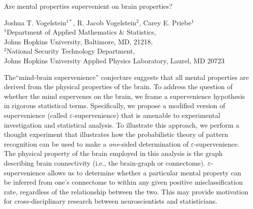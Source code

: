 \documentclass{article}
\newcommand{\eps}{\varepsilon}
\begin{document}
	\begin{center}
{\huge	Are mental properties supervenient on brain properties?}
\end{center}

\vspace{5px}

\begin{center}
{\large		
Joshua T. Vogelstein$^{1*}$, R. Jacob Vogelstein$^2$, Carey E. Priebe$^1$\\
	$^1$Department of Applied Mathematics \& Statistics, \\ Johns Hopkins University, Baltimore, MD, 21218,\\ $^2$National Security Technology Department, \\ Johns Hopkins University Applied Physics Laboratory, Laurel, MD 20723}
	
\end{center}

\vspace{5px}

	
\noindent The``mind-brain supervenience'' conjecture suggests that all mental properties are derived from the physical properties of the brain. To address the question of whether the mind supervenes on the brain, we frame a supervenience hypothesis in rigorous statistical terms. Specifically, we propose a modified version of supervenience (called $\eps$-supervenience) that is amenable to experimental investigation and statistical analysis. To illustrate this approach, we perform a thought experiment that illustrates how the probabilistic theory of pattern recognition can be used to make a \emph{one}-sided determination of $\eps$-supervenience. The physical property of the brain employed in this analysis is the graph describing brain connectivity (i.e., the brain-graph or connectome). $\eps$-supervenience allows us to determine whether a particular mental property can be inferred from one's connectome to within any given positive misclassification rate, regardless of the relationship between the two. This may provide motivation for cross-disciplinary research between neuroscientists and statisticians.


\end{document}

